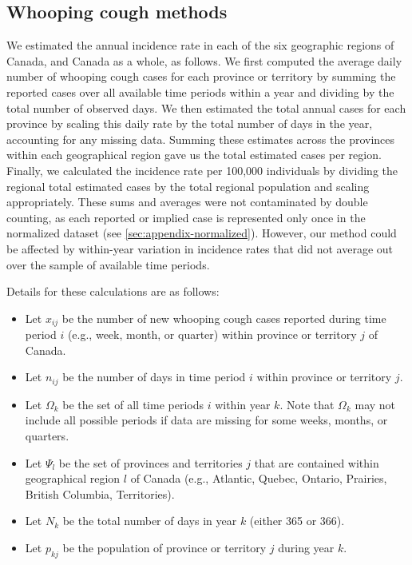 \documentclass[12pt]{article}
\begin{document}
\subsection{Whooping cough methods}\label{sec:appendix-whooping-cough}

We estimated the annual incidence rate in each of the six geographic regions of Canada, and Canada as a whole, as follows. We first computed the average daily number of whooping cough cases for each province or territory by summing the reported cases over all available time periods within a year and dividing by the total number of observed days. We then estimated the total annual cases for each province by scaling this daily rate by the total number of days in the year, accounting for any missing data. Summing these estimates across the provinces within each geographical region gave us the total estimated cases per region. Finally, we calculated the incidence rate per 100,000 individuals by dividing the regional total estimated cases by the total regional population and scaling appropriately. These sums and averages were not contaminated by double counting, as each reported or implied case is represented only once in the normalized dataset (see \cref{sec:appendix-normalized}). However, our method could be affected by within-year variation in incidence rates that did not average out over the sample of available time periods.

Details for these calculations are as follows:
\begin{itemize}
    \item Let \( x_{ij} \) be the number of new whooping cough cases reported during time period \( i \) (e.g., week, month, or quarter) within province or territory \( j \) of Canada.
    \item Let \( n_{ij} \) be the number of days in time period \( i \) within province or territory \( j \).
    \item Let \( \Omega_k \) be the set of all time periods \( i \) within year \( k \). Note that \( \Omega_k \) may not include all possible periods if data are missing for some weeks, months, or quarters.
    \item Let \( \Psi_l \) be the set of provinces and territories \( j \) that are contained within geographical region \( l \) of Canada (e.g., Atlantic, Quebec, Ontario, Prairies, British Columbia, Territories).
    \item Let \( N_k \) be the total number of days in year \( k \) (either 365 or 366).
    \item Let \( p_{kj} \) be the population of province or territory \( j \) during year \( k \).
\end{itemize}
\end{document}
